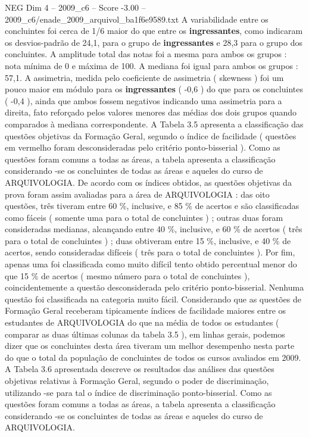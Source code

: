 \begin{textsample}{NEG Dim 4 – 2009\_c6 – Score -3.00 – 2009\_c6/enade\_2009\_arquivol\_ba1f6e9589.txt}
A variabilidade entre os concluintes foi cerca de 1/6 maior do que entre os \textbf{ingressantes}, como indicaram os desvios-padrão de 24,1, para o grupo de \textbf{ingressantes} e 28,3 para o grupo dos concluintes.
A amplitude total das notas foi a mesma para ambos os grupos : nota mínima de 0 e máxima de 100.
A mediana foi igual para ambos os grupos : 57,1.
A assimetria, medida pelo coeficiente de assimetria ( skewness ) foi um pouco maior em módulo para os \textbf{ingressantes} ( -0,6 ) do que para os concluintes ( -0,4 ), ainda que ambos fossem negativos indicando uma assimetria para a direita, fato reforçado pelos valores menores das médias dos dois grupos quando comparados à mediana correspondente.
A Tabela 3.5 apresenta a classificação das questões objetivas da Formação Geral, segundo o índice de facilidade ( questões em vermelho foram desconsideradas pelo critério ponto-bisserial ).
Como as questões foram comuns a todas as áreas, a tabela apresenta a classificação considerando -se os concluintes de todas as áreas e aqueles do curso de ARQUIVOLOGIA.
De acordo com os índices obtidos, as questões objetivas da prova foram assim avaliadas para a área de ARQUIVOLOGIA : das oito questões, três tiveram entre 60 \%, inclusive, e 85 \% de acertos e são classificadas como fáceis ( somente uma para o total de concluintes ) ; outras duas foram consideradas medianas, alcançando entre 40 \%, inclusive, e 60 \% de acertos ( três para o total de concluintes ) ; duas obtiveram entre 15 \%, inclusive, e 40 \% de acertos, sendo consideradas difíceis ( três para o total de concluintes ).
Por fim, apenas uma foi classificada como muito difícil tento obtido percentual menor do que 15 \% de acertos ( mesmo número para o total de concluintes ), coincidentemente a questão desconsiderada pelo critério ponto-bisserial.
Nenhuma questão foi classificada na categoria muito fácil.
Considerando que as questões de Formação Geral receberam tipicamente índices de facilidade maiores entre os estudantes de ARQUIVOLOGIA do que na média de todos os estudantes ( comparar as duas últimas colunas da tabela 3.5 ), em linhas gerais, podemos dizer que os concluintes desta área tiveram um melhor desempenho nesta parte do que o total da população de concluintes de todos os cursos avaliados em 2009.
A Tabela 3.6 apresentada descreve os resultados das análises das questões objetivas relativas à Formação Geral, segundo o poder de discriminação, utilizando -se para tal o índice de discriminação ponto-bisserial.
Como as questões foram comuns a todas as áreas, a tabela apresenta a classificação considerando -se os concluintes de todas as áreas e aqueles do curso de ARQUIVOLOGIA.

\end{textsample}
